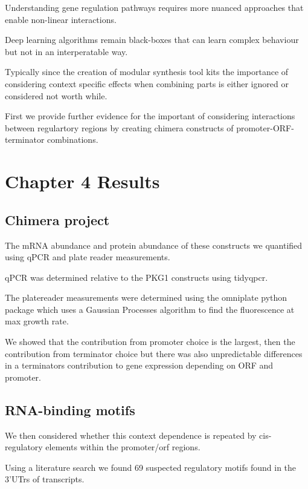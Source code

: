 \documentclass{SBCbookchapter}
\begin{document}
Understanding gene regulation pathways requires more nuanced approaches that enable non-linear interactions. 

Deep learning algorithms remain black-boxes that can learn complex behaviour but not in an interperatable way.

Typically since the creation of modular synthesis tool kits the importance of considering context specific effects when combining parts is either ignored or considered not worth while.

 First we provide further evidence for the important of considering interactions between regulartory regions by creating chimera constructs of promoter-ORF-terminator combinations.
 
\section{Chapter 4 Results}

\subsection{Chimera project}

The mRNA abundance and protein abundance of these constructs we quantified using qPCR and plate reader measurements.

qPCR was determined relative to the PKG1 constructs using tidyqpcr.

The platereader measurements were determined using the omniplate python package which uses a Gaussian Processes algorithm to find the fluorescence at max growth rate.

We showed that the contribution from promoter choice is the largest, then the contribution from terminator choice but there was also unpredictable differences in a terminators contribution to gene expression depending on ORF and promoter.

\subsection{RNA-binding motifs}

We then considered whether this context dependence is repeated by cis-regulatory elements within the promoter/orf regions.

Using a literature search we found 69 suspected regulatory motifs found in the 3'UTrs of transcripts.
\end{document}
